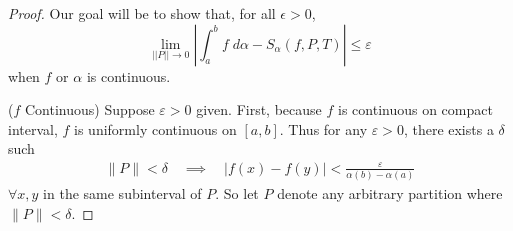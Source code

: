 \documentclass[12pt]{book}
\numberwithin{equation}{section} %
\theoremstyle{plain}
\theoremstyle{definition}
\theoremstyle{remark}
\begin{document}
\begin{proof}
Our goal will be to show that, for all $\epsilon>0$,
\begin{equation}
    \label{contequiv.toshow}
    \lim_{||P||\rightarrow 0}
    \left\lvert \int^b_a f \; d\alpha - S_\alpha(f,P,T) \right\rvert
        \leq \varepsilon
\end{equation}
when $f$ or $\alpha$ is continuous.

($f$ Continuous)
Suppose $\varepsilon>0$ given.
First, because $f$ is continuous on compact interval, $f$ is uniformly
continuous on $[a,b]$. Thus for any $\varepsilon>0$, there exists a
$\delta$ such
\begin{align*}
  \lVert P\rVert <\delta
  \quad\implies\quad
  |f(x)-f(y)|<\frac{\varepsilon}{\alpha(b)-\alpha(a)}
\end{align*}
$\forall x,y$ in the same subinterval of $P$.
So let $P$ denote any arbitrary partition where $\lVert P\rVert<\delta$.


\end{proof}
\end{document}
